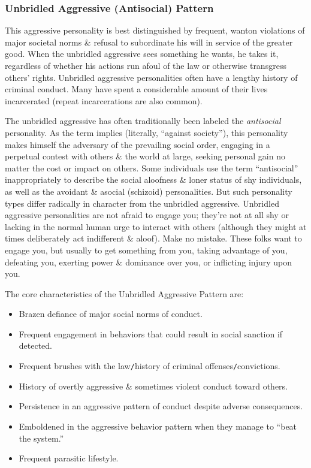 \documentclass{article}
\numberwithin{equation}{section}
\begin{document}
\subsubsection{Unbridled Aggressive (Antisocial) Pattern}
This aggressive personality is best distinguished by frequent, wanton violations of major societal norms \& refusal to subordinate his will in service of the greater good. When the unbridled aggressive sees something he wants, he takes it, regardless of whether his actions run afoul of the law or otherwise transgress others' rights. Unbridled aggressive personalities often have a lengthy history of criminal conduct. Many have spent a considerable amount of their lives incarcerated (repeat incarcerations are also common).

The unbridled aggressive has often traditionally been labeled the \textit{antisocial} personality. As the term implies (literally, ``against society''), this personality makes himself the adversary of the prevailing social order, engaging in a perpetual contest with others \& the world at large, seeking personal gain no matter the cost or impact on others. Some individuals use the term ``antisocial'' inappropriately to describe the social aloofness \& loner status of shy individuals, as well as the avoidant \& asocial (schizoid) personalities. But such personality types differ radically in character from the unbridled aggressive. Unbridled aggressive personalities are not afraid to engage you; they're not at all shy or lacking in the normal human urge to interact with others (although they might at times deliberately act indifferent \& aloof). Make no mistake. These folks want to engage you, but usually to get something from you, taking advantage of you, defeating you, exerting power \& dominance over you, or inflicting injury upon you.

The core characteristics of the Unbridled Aggressive Pattern are:
\begin{itemize}
	\item Brazen defiance of major social norms of conduct.
	\item Frequent engagement in behaviors that could result in social sanction if detected.
	\item Frequent brushes with the law\texttt{/}history of criminal offenses\texttt{/}convictions.
	\item History of overtly aggressive \& sometimes violent conduct toward others.
	\item Persistence in an aggressive pattern of conduct despite adverse consequences.
	\item Emboldened in the aggressive behavior pattern when they manage to ``beat the system.''
	\item Frequent parasitic lifestyle.
\end{itemize}
\end{document}
